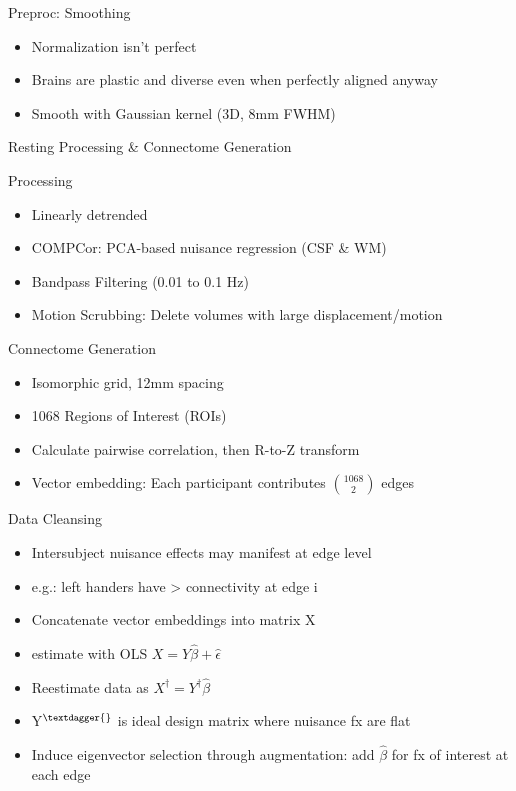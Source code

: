 \documentclass[presentation]{beamer}
\begin{document}
\begin{frame}[label={sec:orgheadline13}]{Preproc: Smoothing}
\begin{itemize}
\item Normalization isn't perfect
\item Brains are plastic and diverse even when perfectly aligned anyway
\item Smooth with Gaussian kernel (3D, 8mm FWHM)
\end{itemize}
\end{frame}
\begin{frame}[label={sec:orgheadline14}]{Resting Processing \& Connectome Generation}
\begin{block}{Processing}
\begin{itemize}
\item Linearly detrended
\item COMPCor: PCA-based nuisance regression (CSF \& WM)
\item Bandpass Filtering (0.01 to 0.1 Hz)
\item Motion Scrubbing: Delete volumes with large displacement/motion
\end{itemize}
\end{block}
\begin{block}{Connectome Generation}
\begin{itemize}
\item Isomorphic grid, 12mm spacing
\item 1068 Regions of Interest (ROIs)
\item Calculate pairwise correlation, then R-to-Z transform
\item Vector embedding: Each participant contributes \({1068}\choose{2}\) edges
\end{itemize}
\end{block}
\end{frame}
\begin{frame}[label={sec:orgheadline15}]{Data Cleansing}
\begin{itemize}
\item Intersubject nuisance effects may manifest at edge level
\item e.g.: left handers have > connectivity at edge i
\item Concatenate vector embeddings into matrix X
\item estimate with OLS \(X = Y\hat{\beta} + \hat{\epsilon}\)
\item Reestimate data as \(X^{\dagger} = Y^{\dagger}\hat{\beta}\)
\item Y\(^{\textdagger{}}\) is ideal design matrix where nuisance fx are flat
\item Induce eigenvector selection through augmentation: add \(\hat{\beta}\) for fx of interest at each edge
\end{itemize}
\end{frame}
\end{document}

